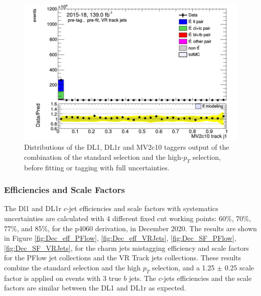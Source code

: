 \documentclass[letterpaper,12pt]{article}
\begin{document}
\begin{figure}[h]
\begin{minipage}[b]{.45\textwidth}
	\end{minipage}\hfill
	\begin{minipage}[b]{.45\textwidth}
	\centering
	\includegraphics[width=1\textwidth]{Oct_distributions/pretagNoRwDL1rwithhighpTVRJets_scaledall/DataMC_J1_MV2c10.png}
	\end{minipage}
	\caption{Distributions of the DL1, DL1r and MV2c10 taggers output of 
	the combination of the standard selection and the high-$p_T$ selection, 
	before fitting or tagging with full uncertainties.} \label{fig:taggers_VRJets}
	\end{figure}	

\subsubsection{Efficiencies and Scale Factors}

The Dl1 and DL1r $c$-jet efficiencies and scale factors with systematics 
uncertainties are calculated with 4 different fixed cut working points: 
60\%, 70\%, 77\%, and 85\%, for the p4060 derivation, in December 2020. 
The results are shown in Figure \ref{fig:Dec_eff_PFlow}, \ref{fig:Dec_eff_VRJets}, 
\ref{fig:Dec_SF_PFlow}, \ref{fig:Dec_SF_VRJets}, for the charm jets mistagging efficiency 
and scale factors for the PFlow jet collections and the VR Track jets collections. 
These results combine the standard selection and the high $p_T$ selection, 
and a 1.25 $\pm$ 0.25 scale factor is applied on events with 3 true $b$ jets. 
The $c$-jets efficiencies and the scale factors are similar between the DL1 and DL1r as expected. 
\end{document}

